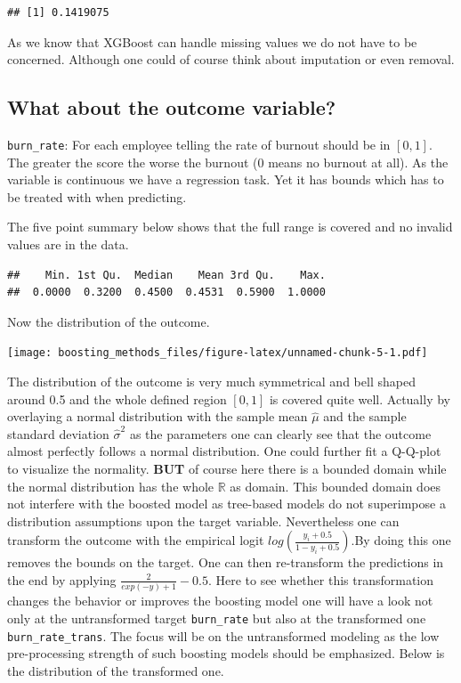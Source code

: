 \documentclass[
]{book}
\begin{document}
\begin{verbatim}
## [1] 0.1419075
\end{verbatim}

As we know that XGBoost can handle missing values we do not have to be concerned. Although one could of course think about imputation or even removal.

\hypertarget{what-about-the-outcome-variable}{%
\subsection{What about the outcome variable?}\label{what-about-the-outcome-variable}}

\texttt{burn\_rate}: For each employee telling the rate of burnout should be in \([0,1]\). The greater the score the worse the burnout (0 means no burnout at all). As the variable is continuous we have a regression task. Yet it has bounds which has to be treated with when predicting.

The five point summary below shows that the full range is covered and no invalid values are in the data.

\begin{verbatim}
##    Min. 1st Qu.  Median    Mean 3rd Qu.    Max. 
##  0.0000  0.3200  0.4500  0.4531  0.5900  1.0000
\end{verbatim}

Now the distribution of the outcome.

\texttt{[image: boosting\_methods\_files/figure-latex/unnamed-chunk-5-1.pdf]}

The distribution of the outcome is very much symmetrical and bell shaped around 0.5 and the whole defined region \([0,1]\) is covered quite well. Actually by overlaying a normal distribution with the sample mean \(\hat{\mu}\) and the sample standard deviation \(\hat{\sigma}^2\) as the parameters one can clearly see that the outcome almost perfectly follows a normal distribution. One could further fit a Q-Q-plot to visualize the normality. \textbf{BUT} of course here there is a bounded domain while the normal distribution has the whole \(\mathbb{R}\) as domain. This bounded domain does not interfere with the boosted model as tree-based models do not superimpose a distribution assumptions upon the target variable. Nevertheless one can transform the outcome with the empirical logit \(log(\frac{y_i+0.5}{1-y_i+0.5})\).By doing this one removes the bounds on the target. One can then re-transform the predictions in the end by applying \(\frac{2}{exp(-y)+1}-0.5\). Here to see whether this transformation changes the behavior or improves the boosting model one will have a look not only at the untransformed target \texttt{burn\_rate} but also at the transformed one \texttt{burn\_rate\_trans}. The focus will be on the untransformed modeling as the low pre-processing strength of such boosting models should be emphasized. Below is the distribution of the transformed one.
\end{document}
